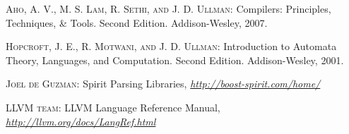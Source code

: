 \documentclass[a4paper,oneside,11pt]{book}
\theoremstyle{definition}
\begin{document}
\clearpage
\begin{thebibliography}{4}

 \textsc{Aho, A. V., M. S. Lam, R. Sethi, and J. D. Ullman}:
Compilers: Principles, Techniques, \& Tools. Second Edition. Addison-Wesley, 2007.

 \textsc{Hopcroft, J. E., R. Motwani, and J. D. Ullman}:
Introduction to Automata Theory, Languages, and Computation. Second Edition. Addison-Wesley, 2001.

 \textsc{Joel de Guzman}:
Spirit Parsing Libraries,
\textit{\url{http://boost-spirit.com/home/}}

 \textsc{LLVM team}:
LLVM Language Reference Manual,
\textit{\url{http://llvm.org/docs/LangRef.html}}

\end{thebibliography}
\end{document}
